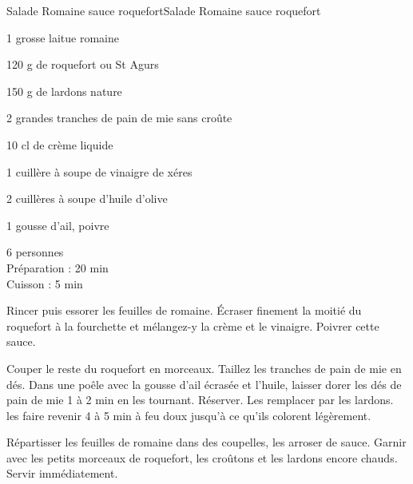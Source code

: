 \begin{recette}{Salade Romaine sauce roquefort}{Salade Romaine sauce roquefort}

\begin{ingredients}
1 grosse laitue romaine\par
120 g de roquefort ou St Agurs\par
150 g de lardons nature\par
2 grandes tranches de pain de mie sans croûte\par
10 cl de crème liquide\par
1 cuillère à soupe de vinaigre de xéres\par
2 cuillères à soupe d'huile d'olive\par
1 gousse d'ail, poivre\par
\end{ingredients}

\begin{infos}
6 personnes	\\
Préparation : 20 min\\
Cuisson : 5 min\\
\end{infos}

\begin{etapes}
\item Rincer puis essorer les feuilles de romaine. Écraser finement la moitié du roquefort à la fourchette et mélangez-y la crème et le vinaigre. Poivrer cette sauce.
\item Couper le reste du roquefort en morceaux. Taillez les tranches de pain de mie en dés. Dans une poêle avec la gousse d'ail écrasée et l'huile, laisser dorer les dés de pain de mie 1 à 2 min en les tournant. Réserver. Les remplacer par les lardons. les faire revenir 4 à 5 min à feu doux jusqu'à ce qu'ils colorent légèrement.
\item Répartisser les feuilles de romaine dans des coupelles, les arroser de sauce. Garnir avec les petits morceaux de roquefort, les croûtons et les lardons encore chauds. Servir immédiatement.
\end{etapes}

\end{recette}